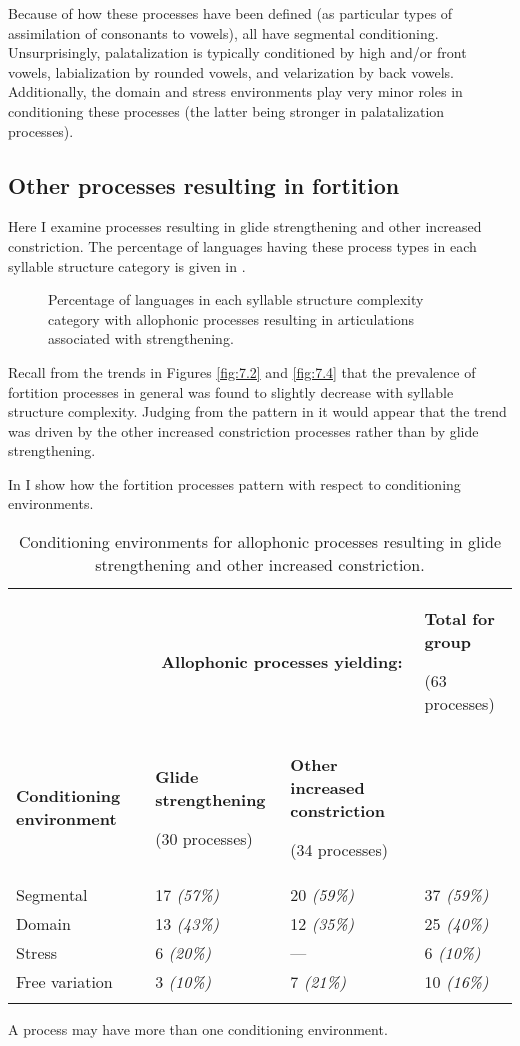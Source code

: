   Because of how these processes have been defined (as particular types of assimilation of consonants to vowels), all have segmental conditioning. Unsurprisingly, palatalization is typically conditioned by high and/or front vowels, labialization by rounded vowels, and velarization by back vowels. Additionally, the domain and stress environments play very minor roles in conditioning these processes (the latter being stronger in palatalization processes).

\subsection{Other processes resulting in fortition}\label{sec:7.3.4}

  Here I examine processes resulting in glide strengthening and other increased constriction. The percentage of languages having these process types in each syllable structure category is given in .

\begin{figure}
\caption{\label{fig:7.8} Percentage of languages in each syllable structure complexity category with allophonic processes resulting in articulations associated with strengthening.}
\end{figure}

  Recall from the trends in Figures \ref{fig:7.2} and \ref{fig:7.4} that the prevalence of fortition processes in general was found to slightly decrease with syllable structure complexity. Judging from the pattern in  it would appear that the trend was driven by the other increased constriction processes rather than by glide strengthening.

  In  I show how the fortition processes pattern with respect to conditioning environments.

\begin{table}
\begin{tabularx}{\textwidth}{XXXX}
\lsptoprule
 & \multicolumn{2}{c}{ \textbf{Allophonic processes yielding:}} & { \textbf{Total for group}}

 (63 processes)\\
 \textbf{Conditioning environment} & { \textbf{Glide strengthening}}

 (30 processes) & { \textbf{Other increased constriction}}

 (34 processes) & \\
 Segmental & 17 \textit{(57\%)} & 20 \textit{(59\%)} & 37 \textit{(59\%)}\\
 Domain & 13 \textit{(43\%)} & 12 \textit{(35\%)} & 25 \textit{(40\%)}\\
 Stress & 6 \textit{(20\%)} & — & 6 \textit{(10\%)}\\
 Free variation & 3 \textit{(10\%)} & 7 \textit{(21\%)} & 10 \textit{(16\%)}\\
\lspbottomrule
\end{tabularx}
\caption{\label{tab:7.4}Conditioning environments for allophonic processes resulting in glide strengthening and other increased constriction.}A process may have more than one conditioning environment.
\end{table}

